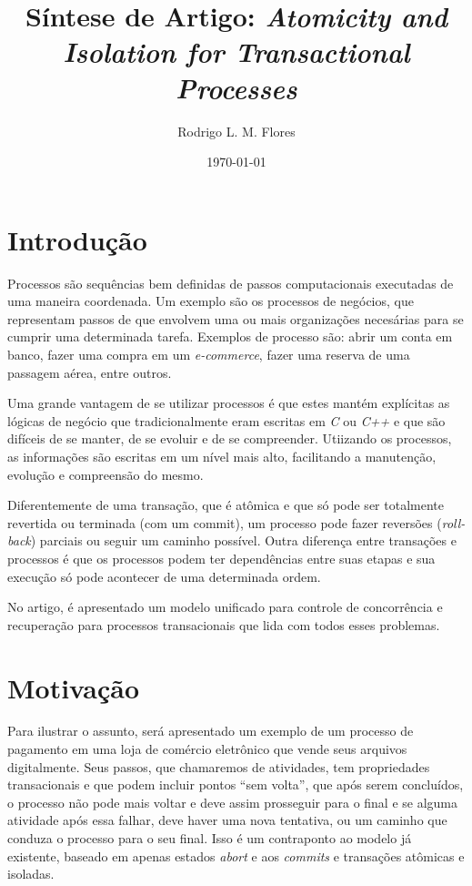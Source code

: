 \documentclass[a4paper,12pt,notitlepage]{article}
\title{Síntese de Artigo: \textit{Atomicity and Isolation for Transactional Processes}}
\author{Rodrigo L. M. Flores}
\date{\today}
\begin{document}
\maketitle

\section{Introdução}

Processos são sequências bem definidas de passos computacionais executadas de uma maneira coordenada. Um exemplo são os processos de negócios, que representam passos de que envolvem uma ou mais organizações necesárias para se cumprir uma determinada tarefa. Exemplos de processo são: abrir um conta em banco, fazer uma compra em um \textit{e-commerce}, fazer uma reserva de uma passagem aérea, entre outros. 

Uma grande vantagem de se utilizar processos é que estes mantém explícitas as lógicas de negócio que tradicionalmente eram escritas em \textit{C} ou \textit{C++}  e que são difíceis de se manter, de se evoluir e de se compreender. Utiizando os processos, as informações são escritas em um nível mais alto, facilitando a manutenção, evolução e compreensão do mesmo. 

Diferentemente de uma transação, que é atômica e que só pode ser totalmente revertida ou terminada (com um commit),  um processo pode fazer reversões (\textit{roll-back}) parciais ou seguir um caminho possível. Outra diferença entre transações e processos é que os processos podem ter dependências entre suas etapas e sua execução só pode acontecer de uma determinada ordem. 

No artigo, é apresentado um modelo unificado para controle de concorrência e recuperação para processos transacionais que lida com todos esses problemas.

\newpage

\section{Motivação}

Para ilustrar o assunto, será apresentado um exemplo de um processo de pagamento em uma loja de comércio eletrônico que vende seus arquivos digitalmente. Seus passos, que chamaremos de atividades, tem propriedades transacionais e que podem incluir pontos ``sem volta'', que após serem concluídos, o processo não pode mais voltar e deve assim prosseguir para o final e se alguma atividade após essa falhar, deve haver uma nova tentativa, ou um caminho que conduza o processo para o seu final. Isso é um contraponto ao modelo já existente, baseado em apenas estados \textit{abort} e aos \textit{commits} e transações atômicas e isoladas. 
\end{document}
